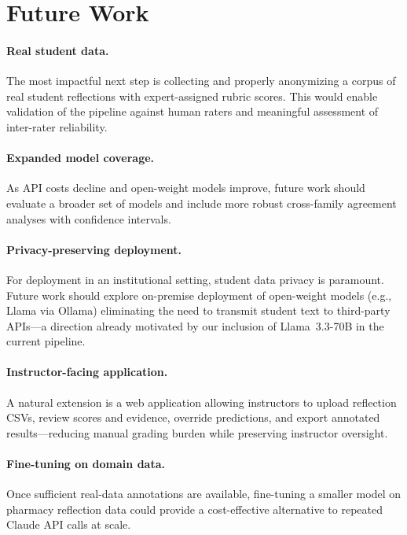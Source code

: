 \documentclass[11pt]{article}
\begin{document}
\section{Future Work}

\paragraph{Real student data.}
The most impactful next step is collecting and properly anonymizing a corpus of real student reflections with expert-assigned rubric scores. This would enable validation of the pipeline against human raters and meaningful assessment of inter-rater reliability.

\paragraph{Expanded model coverage.}
As API costs decline and open-weight models improve, future work should evaluate a broader set of models and include more robust cross-family agreement analyses with confidence intervals.

\paragraph{Privacy-preserving deployment.}
For deployment in an institutional setting, student data privacy is paramount. Future work should explore on-premise deployment of open-weight models (e.g., Llama via Ollama) eliminating the need to transmit student text to third-party APIs—a direction already motivated by our inclusion of Llama~3.3-70B in the current pipeline.

\paragraph{Instructor-facing application.}
A natural extension is a web application allowing instructors to upload reflection CSVs, review scores and evidence, override predictions, and export annotated results—reducing manual grading burden while preserving instructor oversight.

\paragraph{Fine-tuning on domain data.}
Once sufficient real-data annotations are available, fine-tuning a smaller model on pharmacy reflection data could provide a cost-effective alternative to repeated Claude API calls at scale.
\end{document}
